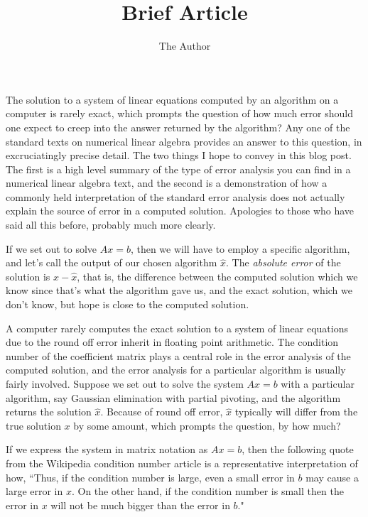 \documentclass[11pt]{amsart}
\title{Brief Article}
\author{The Author}
\begin{document}
\maketitle


The solution to a system of linear equations computed by an algorithm on a computer is rarely exact, which prompts the question of how much error should one expect to creep into the answer returned by the algorithm?
Any one of the standard texts on numerical linear algebra provides an answer to this question, in excruciatingly precise detail.
The two things I hope to convey in this blog post. 
The first is a high level summary of the type of error analysis you can find in a numerical linear algebra text, and the second is a demonstration of how a commonly held interpretation of the standard error analysis does not actually explain the source of error in a computed solution.
Apologies to those who have said all this before, probably much more clearly.

If we set out to solve \(Ax=b\), then we will have to employ a specific algorithm, and let's call the output of our chosen algorithm \(\hat{x}\).
The \emph{absolute error} of the solution is \(x-\hat{x}\), that is, the difference between the computed solution which we know since that's what the algorithm gave us, and the exact solution, which we don't know, but hope is close to the computed solution.

A computer rarely computes the exact solution to a system of linear equations due to the round off error inherit in floating point arithmetic.
The condition number of the coefficient matrix plays a central role in the error analysis of the computed solution, and
the error analysis for a particular algorithm is usually fairly involved.
Suppose we set out to solve the system \(A x = b\) with a particular algorithm, say Gaussian elimination with partial pivoting, and the algorithm returns the solution \(\hat{x}\).
Because of round off error, \(\hat{x}\) typically will differ from the true solution \(x\) by some amount, which prompts the question, by how much?

If we express the system in matrix notation as \(Ax=b\), then the following quote from the Wikipedia condition number article is a representative interpretation of how, ``Thus, if the condition number is large, even a small error in \(b\) may cause a large error in \(x\). On the other hand, if the condition number is small then the error in \(x\) will not be much bigger than the error in \(b\)."
\end{document}

